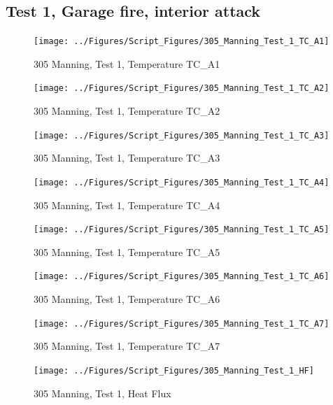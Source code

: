 \documentclass[12pt,oneside]{book}
\begin{document}
\subsection{Test 1, Garage fire, interior attack}

\begin{figure}[!ht]
\texttt{[image: ../Figures/Script\_Figures/305\_Manning\_Test\_1\_TC\_A1]}
\caption{305 Manning, Test 1, Temperature TC\_A1}
\label{fig:305_Manning_Test_1_TC_A1}
\end{figure}

\begin{figure}[!ht]
\texttt{[image: ../Figures/Script\_Figures/305\_Manning\_Test\_1\_TC\_A2]}
\caption{305 Manning, Test 1, Temperature TC\_A2}
\label{fig:305_Manning_Test_1_TC_A2}
\end{figure}

\begin{figure}[!ht]
\texttt{[image: ../Figures/Script\_Figures/305\_Manning\_Test\_1\_TC\_A3]}
\caption{305 Manning, Test 1, Temperature TC\_A3}
\label{fig:305_Manning_Test_1_TC_A3}
\end{figure}

\begin{figure}[!ht]
\texttt{[image: ../Figures/Script\_Figures/305\_Manning\_Test\_1\_TC\_A4]}
\caption{305 Manning, Test 1, Temperature TC\_A4}
\label{fig:305_Manning_Test_1_TC_A4}
\end{figure}

\begin{figure}[!ht]
\texttt{[image: ../Figures/Script\_Figures/305\_Manning\_Test\_1\_TC\_A5]}
\caption{305 Manning, Test 1, Temperature TC\_A5}
\label{fig:305_Manning_Test_1_TC_A5}
\end{figure}

\begin{figure}[!ht]
\texttt{[image: ../Figures/Script\_Figures/305\_Manning\_Test\_1\_TC\_A6]}
\caption{305 Manning, Test 1, Temperature TC\_A6}
\label{fig:305_Manning_Test_1_TC_A6}
\end{figure}

\begin{figure}[!ht]
\texttt{[image: ../Figures/Script\_Figures/305\_Manning\_Test\_1\_TC\_A7]}
\caption{305 Manning, Test 1, Temperature TC\_A7}
\label{fig:305_Manning_Test_1_TC_A7}
\end{figure}

\begin{figure}[!ht]
\texttt{[image: ../Figures/Script\_Figures/305\_Manning\_Test\_1\_HF]}
\caption{305 Manning, Test 1, Heat Flux}
\label{fig:305_Manning_Test_1_HF}
\end{figure}
\end{document}
